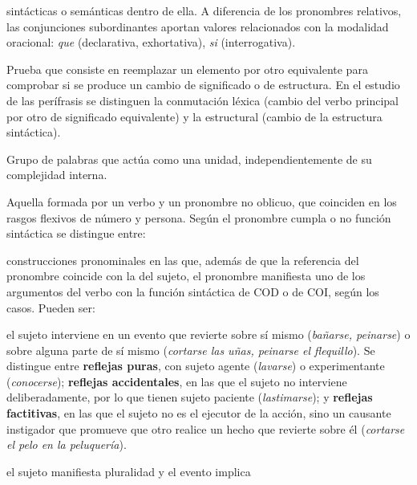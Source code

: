 \begin{glosariogeneral}
        sintácticas o semánticas dentro de ella. A diferencia de los pronombres
        relativos, las conjunciones subordinantes aportan valores relacionados
        con la modalidad oracional: \textit{que} (declarativa, exhortativa),
        \textit{si} (interrogativa).
  \item[Conmutación:] Prueba que consiste en reemplazar un elemento por otro
        equivalente para comprobar si se produce un cambio de significado o de
        estructura. En el estudio de las perífrasis se distinguen la
        conmutación léxica (cambio del verbo principal por otro de significado
        equivalente) y la estructural (cambio de la estructura sintáctica).
  \item[Constituyente:] Grupo de palabras que actúa como una unidad,
        independientemente de su complejidad interna.
  \item[Construcción pronominal:] Aquella formada por un verbo y un pronombre no
        oblicuo, que coinciden en los rasgos flexivos de número y persona. Según
        el pronombre cumpla o no función sintáctica se distingue entre:
    \begin{glosario}
      \item[reflejas:] construcciones pronominales en las que, además de que la
            referencia del pronombre coincide con la del sujeto, el pronombre
            manifiesta uno de los argumentos del verbo con la función
            sintáctica de COD o de COI, según los casos. Pueden ser:
        \begin{glosario}
          \item[reflexivas:] el sujeto interviene en un evento que revierte
                sobre sí mismo (\textit{bañarse, peinarse}) o sobre alguna parte
                de sí mismo (\textit{cortarse las uñas, peinarse el flequillo}).
                Se distingue entre \textbf{reflejas puras}, con sujeto agente
                (\textit{lavarse}) o experimentante (\textit{conocerse});
                \textbf{reflejas accidentales}, en las que el sujeto no
                interviene deliberadamente, por lo que tienen sujeto paciente
                (\textit{lastimarse}); y \textbf{reflejas factitivas}, en las que
                el sujeto no es el ejecutor de la acción, sino un causante
                instigador que promueve que otro realice un hecho que revierte
                sobre él (\textit{cortarse el pelo en la peluquería}).
          \item[recíprocas:] el sujeto manifiesta pluralidad y el evento implica

\end{glosario}
\end{glosario}
\end{glosariogeneral}
